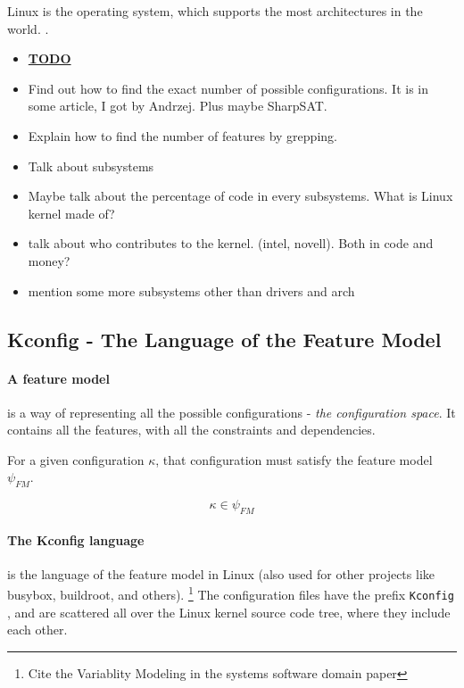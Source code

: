 \documentclass[a4paper,11pt]{report}
\newcommand{\textcode}[1]{
    \fboxsep=1pt
    \texttt{\colorbox{gray!20}{#1}}
}
\newcommand{\figa}{
    \begin{figure}[!htpb]
    \centering
}
\newcommand{\figb}[2]{
    \caption{#1}
    \label{#2}
    \end{figure}
}
\begin{document}
Linux is the operating system, which supports the most architectures in the 
world.
    \cite{22thbirthday}
.



\begin{itemize}
    \item \underline{\textbf{TODO}}
    \item Find out how to find the exact number of possible configurations. It 
        is in some article, I got by Andrzej. Plus maybe SharpSAT.
    \item Explain how to find the number of features by grepping.
    \item Talk about subsystems
    \item Maybe talk about the percentage of code in every subsystems. What is 
        Linux kernel made of?
    \item talk about who contributes to the kernel. (intel, novell). Both in 
        code and money?
    \item mention some more subsystems other than drivers and arch
\end{itemize}


\subsection{Kconfig - The Language of the Feature Model}

\paragraph{A feature model} is a way of representing all the possible 
configurations - \emph{the configuration space}. It contains all the features, 
with all the constraints and dependencies.

For a given configuration $\kappa$, that configuration must satisfy the feature 
model $\psi_{FM}$.

\begin{equation}
    \kappa \in \psi_{FM}
\end{equation}

\paragraph{The Kconfig language} is the language of the feature model in Linux 
(also used for other projects like busybox, buildroot, and others).
    \footnote{Cite the Variablity Modeling in the systems software domain paper}
The configuration files have the prefix \textcode{Kconfig}, and are 
scattered all over the Linux kernel source code tree, where they include each 
other.
\\
\end{document}
